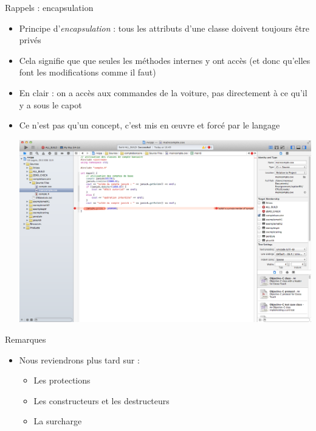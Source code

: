 \begin{frame}{Rappels : encapsulation}
\begin{itemize}
\item Principe d'\textit{encapsulation} : tous les attributs d'une classe
doivent toujours être privés
\item Cela signifie que que seules les méthodes internes y ont accès (et donc qu'elles font les modifications comme il faut)
\item En clair : on a accès aux commandes de la voiture, pas directement à ce qu'il y a sous le capot
\item Ce n'est pas qu'un concept, c'est mis en \oe uvre et forcé par le langage
\begin{center}
\includegraphics[width=\textwidth]{fig/encapsulation.png}
\end{center}
\end{itemize}
\end{frame}

\begin{frame}{Remarques}
\begin{itemize}
\item Nous reviendrons plus tard sur :
\begin{itemize}
\item Les protections
\item Les constructeurs et les destructeurs
\item La surcharge
\end{itemize}
\end{itemize}
\end{frame}

